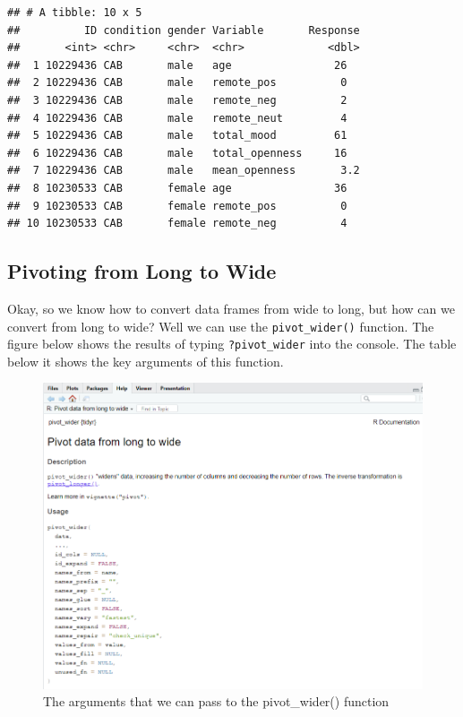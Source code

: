 \documentclass[
]{book}
\begin{document}
\begin{verbatim}
## # A tibble: 10 x 5
##          ID condition gender Variable       Response
##       <int> <chr>     <chr>  <chr>             <dbl>
##  1 10229436 CAB       male   age                26  
##  2 10229436 CAB       male   remote_pos          0  
##  3 10229436 CAB       male   remote_neg          2  
##  4 10229436 CAB       male   remote_neut         4  
##  5 10229436 CAB       male   total_mood         61  
##  6 10229436 CAB       male   total_openness     16  
##  7 10229436 CAB       male   mean_openness       3.2
##  8 10230533 CAB       female age                36  
##  9 10230533 CAB       female remote_pos          0  
## 10 10230533 CAB       female remote_neg          4
\end{verbatim}

\hypertarget{pivoting-from-long-to-wide}{%
\subsection{Pivoting from Long to Wide}\label{pivoting-from-long-to-wide}}

Okay, so we know how to convert data frames from wide to long, but how can we convert from long to wide? Well we can use the \texttt{pivot\_wider()} function. The figure below shows the results of typing \texttt{?pivot\_wider} into the console. The table below it shows the key arguments of this function.

\begin{figure}
\centering
\includegraphics{img/06-pivotwider.png}
\caption{\label{fig:unnamed-chunk-232}The arguments that we can pass to the pivot\_wider() function}
\end{figure}
\end{document}
